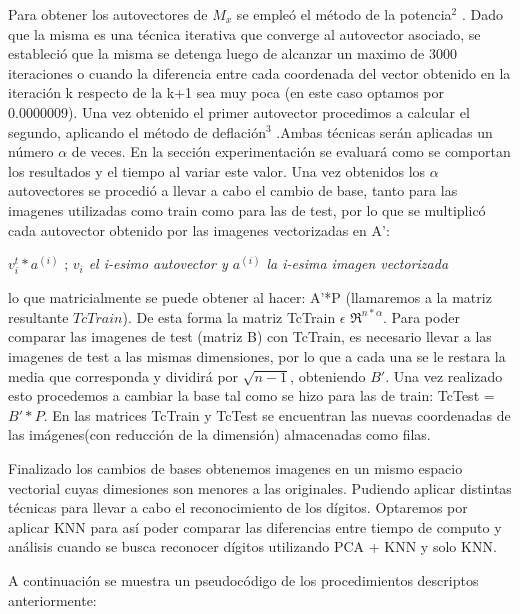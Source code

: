  Para obtener los autovectores de $M_x$ se empleó el método de la potencia$^{2}$ %
. Dado que la misma es una técnica iterativa que converge al autovector asociado, se estableció que la misma se detenga luego de alcanzar un maximo de 3000 iteraciones o cuando la diferencia entre cada coordenada del vector obtenido en la iteración k respecto de la k+1 sea muy poca (en este caso optamos por 0.0000009). Una vez obtenido el primer autovector procedimos a calcular el segundo, aplicando el método de deflación$^{3}$ %
.Ambas técnicas serán aplicadas un número $\alpha$ de veces. En la sección experimentación se evaluará como se comportan los resultados y el tiempo al variar este valor.
Una vez obtenidos los $\alpha$ autovectores se procedió a llevar a cabo el cambio de base, tanto para las imagenes utilizadas como train como para las de test, por lo que se multiplicó cada autovector obtenido por las imagenes vectorizadas en A': \newline

$v_i^{t}*a^{(i)}$ ; \textit{$v_i$ el i-esimo autovector y $a^{(i)}$ la i-esima imagen vectorizada} \newline

lo que matricialmente se puede obtener al hacer: A'*P (llamaremos a la matriz resultante $TcTrain$). De esta forma la matriz TcTrain $\epsilon$ $\Re^{n*\alpha}$. Para poder comparar las imagenes de test (matriz B) con TcTrain, es necesario llevar a las imagenes de test a las mismas dimensiones, por lo que a cada una se le restara la media que corresponda y dividirá por $\sqrt{n-1}$, obteniendo $ B'$. 
Una vez realizado esto procedemos a cambiar la base tal como se hizo para las de train:\newline
 TcTest = $B'*P$. En las matrices TcTrain y TcTest se encuentran las nuevas coordenadas de las imágenes(con reducción de la dimensión) almacenadas como filas.
 

 Finalizado los cambios de bases obtenemos imagenes en un mismo espacio vectorial cuyas dimesiones son menores a las originales. Pudiendo aplicar distintas técnicas para llevar a cabo el reconocimiento de los dígitos. Optaremos por aplicar KNN para así poder comparar las diferencias entre tiempo de computo y análisis cuando se busca reconocer dígitos utilizando PCA + KNN y solo KNN.
 
A continuación se muestra un pseudocódigo de los procedimientos descriptos anteriormente:

